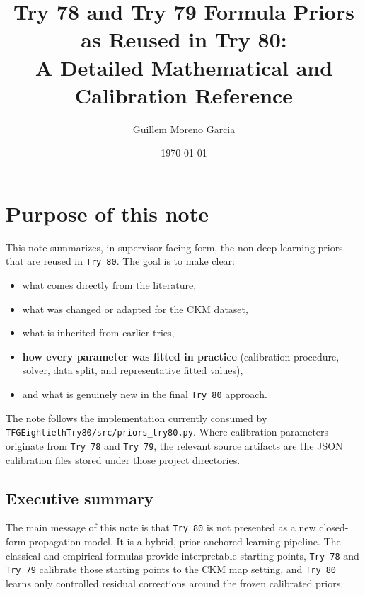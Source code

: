 \documentclass[11pt,a4paper]{article}
\title{Try 78 and Try 79 Formula Priors as Reused in Try 80:\\
A Detailed Mathematical and Calibration Reference}
\author{Guillem Moreno Garcia}
\date{\today}
\begin{document}
\maketitle
\tableofcontents
\newpage

\section{Purpose of this note}

This note summarizes, in supervisor-facing form, the non-deep-learning priors
that are reused in \texttt{Try 80}. The goal is to make clear:

\begin{itemize}
\item what comes directly from the literature,
\item what was changed or adapted for the CKM dataset,
\item what is inherited from earlier tries,
\item \textbf{how every parameter was fitted in practice} (calibration procedure,
      solver, data split, and representative fitted values),
\item and what is genuinely new in the final \texttt{Try 80} approach.
\end{itemize}

The note follows the implementation currently consumed by
\texttt{TFGEightiethTry80/src/priors\_try80.py}. Where calibration
parameters originate from \texttt{Try 78} and \texttt{Try 79}, the relevant
source artifacts are the JSON calibration files stored under those project
directories.

\subsection*{Executive summary}

The main message of this note is that \texttt{Try 80} is not presented as a
new closed-form propagation model. It is a hybrid, prior-anchored learning
pipeline. The classical and empirical formulas provide interpretable starting
points, \texttt{Try 78} and \texttt{Try 79} calibrate those starting points to
the CKM map setting, and \texttt{Try 80} learns only controlled residual
corrections around the frozen calibrated priors.
\end{document}
